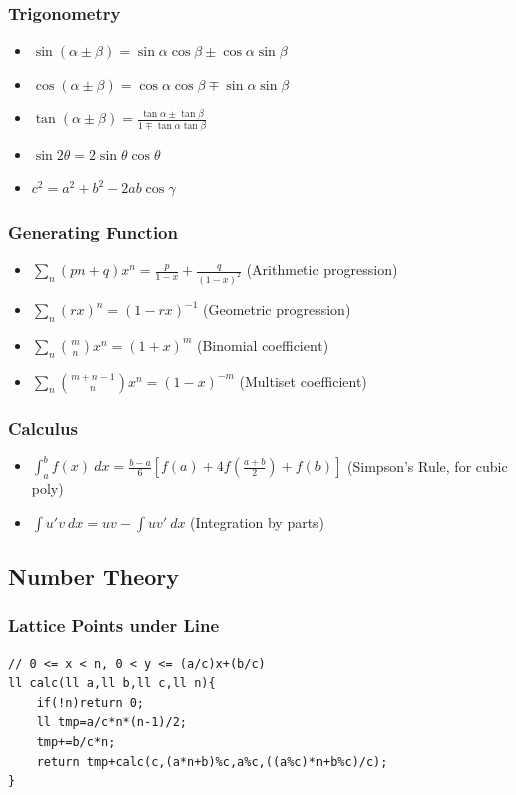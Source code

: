 \documentclass[landscape, 8pt, a4paper, oneside, twocolumn]{extarticle}
\begin{document}
\subsubsection{Trigonometry}
\begin{itemize}
\item $ \sin(\alpha \pm \beta) = \sin\alpha \cos\beta \pm \cos\alpha \sin\beta $
\item $ \cos(\alpha \pm \beta) = \cos\alpha \cos\beta \mp \sin\alpha \sin\beta $
\item $ \tan(\alpha \pm \beta) = \frac{\tan\alpha \pm \tan\beta}{1 \mp \tan\alpha \tan\beta}$
\item $ \sin 2\theta = 2\sin\theta\cos\theta $
\item $ c^2 = a^2 + b^2 - 2ab\cos\gamma$
\end{itemize}
\subsubsection{Generating Function}
\begin{itemize}
    \item $ \sum_{n} (pn + q)x^n = \frac{p}{1-x} + \frac{q}{(1-x)^2}$ (Arithmetic progression)
    \item $ \sum_{n} (rx)^n = (1 - rx)^{-1}$ (Geometric progression)
    \item $ \sum_{n} \binom{m}{n} x^n = (1+x)^m$ (Binomial coefficient)
    \item $ \sum_{n} \binom{m+n-1}{n} x^n = (1-x)^{-m}$ (Multiset coefficient)
\end{itemize}
\subsubsection{Calculus}
\begin{itemize}
    \item $\int_{a}^{b} f(x)\ dx = \frac{b-a}{6}\left[f(a) + 4f(\frac{a+b}{2}) + f(b)\right]$ (Simpson's Rule, for cubic poly)
    \item $\int u'v\ dx = uv - \int uv'\ dx$ (Integration by parts)
\end{itemize}
\subsection{Number Theory}
\subsubsection{Lattice Points under Line}
\begin{verbatim}
// 0 <= x < n, 0 < y <= (a/c)x+(b/c)
ll calc(ll a,ll b,ll c,ll n){
    if(!n)return 0;
    ll tmp=a/c*n*(n-1)/2;
    tmp+=b/c*n;
    return tmp+calc(c,(a*n+b)%c,a%c,((a%c)*n+b%c)/c);
}
\end{verbatim}
\end{document}
